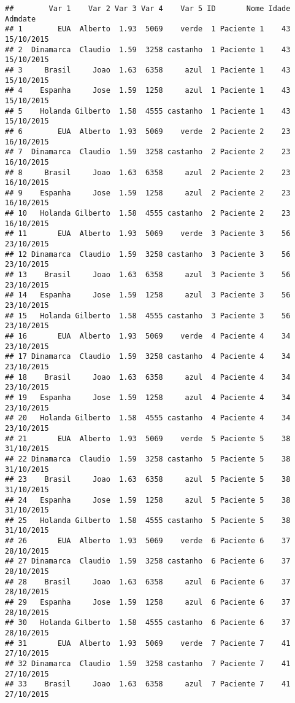 \documentclass[]{article}
\begin{document}
\begin{verbatim}
##        Var 1    Var 2 Var 3 Var 4    Var 5 ID       Nome Idade    Admdate
## 1        EUA  Alberto  1.93  5069    verde  1 Paciente 1    43 15/10/2015
## 2  Dinamarca  Claudio  1.59  3258 castanho  1 Paciente 1    43 15/10/2015
## 3     Brasil     Joao  1.63  6358     azul  1 Paciente 1    43 15/10/2015
## 4    Espanha     Jose  1.59  1258     azul  1 Paciente 1    43 15/10/2015
## 5    Holanda Gilberto  1.58  4555 castanho  1 Paciente 1    43 15/10/2015
## 6        EUA  Alberto  1.93  5069    verde  2 Paciente 2    23 16/10/2015
## 7  Dinamarca  Claudio  1.59  3258 castanho  2 Paciente 2    23 16/10/2015
## 8     Brasil     Joao  1.63  6358     azul  2 Paciente 2    23 16/10/2015
## 9    Espanha     Jose  1.59  1258     azul  2 Paciente 2    23 16/10/2015
## 10   Holanda Gilberto  1.58  4555 castanho  2 Paciente 2    23 16/10/2015
## 11       EUA  Alberto  1.93  5069    verde  3 Paciente 3    56 23/10/2015
## 12 Dinamarca  Claudio  1.59  3258 castanho  3 Paciente 3    56 23/10/2015
## 13    Brasil     Joao  1.63  6358     azul  3 Paciente 3    56 23/10/2015
## 14   Espanha     Jose  1.59  1258     azul  3 Paciente 3    56 23/10/2015
## 15   Holanda Gilberto  1.58  4555 castanho  3 Paciente 3    56 23/10/2015
## 16       EUA  Alberto  1.93  5069    verde  4 Paciente 4    34 23/10/2015
## 17 Dinamarca  Claudio  1.59  3258 castanho  4 Paciente 4    34 23/10/2015
## 18    Brasil     Joao  1.63  6358     azul  4 Paciente 4    34 23/10/2015
## 19   Espanha     Jose  1.59  1258     azul  4 Paciente 4    34 23/10/2015
## 20   Holanda Gilberto  1.58  4555 castanho  4 Paciente 4    34 23/10/2015
## 21       EUA  Alberto  1.93  5069    verde  5 Paciente 5    38 31/10/2015
## 22 Dinamarca  Claudio  1.59  3258 castanho  5 Paciente 5    38 31/10/2015
## 23    Brasil     Joao  1.63  6358     azul  5 Paciente 5    38 31/10/2015
## 24   Espanha     Jose  1.59  1258     azul  5 Paciente 5    38 31/10/2015
## 25   Holanda Gilberto  1.58  4555 castanho  5 Paciente 5    38 31/10/2015
## 26       EUA  Alberto  1.93  5069    verde  6 Paciente 6    37 28/10/2015
## 27 Dinamarca  Claudio  1.59  3258 castanho  6 Paciente 6    37 28/10/2015
## 28    Brasil     Joao  1.63  6358     azul  6 Paciente 6    37 28/10/2015
## 29   Espanha     Jose  1.59  1258     azul  6 Paciente 6    37 28/10/2015
## 30   Holanda Gilberto  1.58  4555 castanho  6 Paciente 6    37 28/10/2015
## 31       EUA  Alberto  1.93  5069    verde  7 Paciente 7    41 27/10/2015
## 32 Dinamarca  Claudio  1.59  3258 castanho  7 Paciente 7    41 27/10/2015
## 33    Brasil     Joao  1.63  6358     azul  7 Paciente 7    41 27/10/2015

\end{verbatim}
\end{document}

